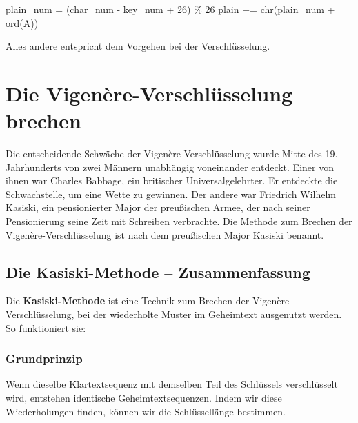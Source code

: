 \documentclass[
  nswissgerman,
  a4paper,
  DIV=11,
  numbers=noendperiod,
  ngerman]{scrreprt}
\newenvironment{Shaded}{\begin{snugshade}}{\end{snugshade}}
\newcommand{\BuiltInTok}[1]{\textcolor[rgb]{0.00,0.23,0.31}{#1}}
\newcommand{\DecValTok}[1]{\textcolor[rgb]{0.68,0.00,0.00}{#1}}
\newcommand{\NormalTok}[1]{\textcolor[rgb]{0.00,0.23,0.31}{#1}}
\newcommand{\OperatorTok}[1]{\textcolor[rgb]{0.37,0.37,0.37}{#1}}
\newcommand{\StringTok}[1]{\textcolor[rgb]{0.13,0.47,0.30}{#1}}
\begin{document}
\begin{Shaded}
\begin{Highlighting}[numbers=left,,]
\NormalTok{    plain\_num }\OperatorTok{=}\NormalTok{ (char\_num }\OperatorTok{{-}}\NormalTok{ key\_num }\OperatorTok{+} \DecValTok{26}\NormalTok{) }\OperatorTok{\%} \DecValTok{26}
\NormalTok{    plain }\OperatorTok{+=} \BuiltInTok{chr}\NormalTok{(plain\_num }\OperatorTok{+} \BuiltInTok{ord}\NormalTok{(}\StringTok{\textquotesingle{}A\textquotesingle{}}\NormalTok{))}
\end{Highlighting}
\end{Shaded}

Alles andere entspricht dem Vorgehen bei der Verschlüsselung.

\chapter{Die Vigenère-Verschlüsselung
brechen}\label{die-vigenuxe8re-verschluxfcsselung-brechen}

Die entscheidende Schwäche der Vigenère-Verschlüsselung wurde Mitte des
19. Jahrhunderts von zwei Männern unabhängig voneinander entdeckt. Einer
von ihnen war Charles Babbage, ein britischer Universalgelehrter. Er
entdeckte die Schwachstelle, um eine Wette zu gewinnen. Der andere war
Friedrich Wilhelm Kasiski, ein pensionierter Major der preußischen
Armee, der nach seiner Pensionierung seine Zeit mit Schreiben
verbrachte. Die Methode zum Brechen der Vigenère-Verschlüsselung ist
nach dem preußischen Major Kasiski benannt.

\section{Die Kasiski-Methode --
Zusammenfassung}\label{die-kasiski-methode-zusammenfassung}

Die \textbf{Kasiski-Methode} ist eine Technik zum Brechen der
Vigenère-Verschlüsselung, bei der wiederholte Muster im Geheimtext
ausgenutzt werden. So funktioniert sie:

\subsection{Grundprinzip}\label{grundprinzip}

Wenn dieselbe Klartextsequenz mit demselben Teil des Schlüssels
verschlüsselt wird, entstehen identische Geheimtextsequenzen. Indem wir
diese Wiederholungen finden, können wir die Schlüssellänge bestimmen.
\end{document}
